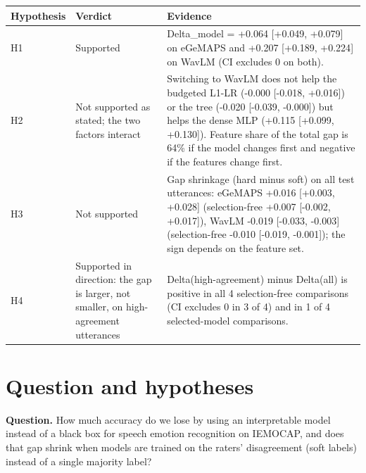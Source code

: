 \documentclass[11pt]{article}
\begin{document}
\begin{longtable}[]{@{}
  >{\raggedright\arraybackslash}p{}
  >{\raggedright\arraybackslash}p{}
  >{\raggedright\arraybackslash}p{}@{}}
\toprule\noalign{}
\begin{minipage}[b]{\linewidth}\raggedright
Hypothesis
\end{minipage} & \begin{minipage}[b]{\linewidth}\raggedright
Verdict
\end{minipage} & \begin{minipage}[b]{\linewidth}\raggedright
Evidence
\end{minipage} \\
\midrule\noalign{}
\endhead
\bottomrule\noalign{}
\endlastfoot
H1 & Supported & Delta\_model = +0.064 {[}+0.049, +0.079{]} on eGeMAPS and +0.207 {[}+0.189, +0.224{]} on WavLM (CI excludes 0 on both). \\
H2 & Not supported as stated; the two factors interact & Switching to WavLM does not help the budgeted L1-LR (-0.000 {[}-0.018, +0.016{]}) or the tree (-0.020 {[}-0.039, -0.000{]}) but helps the dense MLP (+0.115 {[}+0.099, +0.130{]}). Feature share of the total gap is 64\% if the model changes first and negative if the features change first. \\
H3 & Not supported & Gap shrinkage (hard minus soft) on all test utterances: eGeMAPS +0.016 {[}+0.003, +0.028{]} (selection-free +0.007 {[}-0.002, +0.017{]}), WavLM -0.019 {[}-0.033, -0.003{]} (selection-free -0.010 {[}-0.019, -0.001{]}); the sign depends on the feature set. \\
H4 & Supported in direction: the gap is larger, not smaller, on high-agreement utterances & Delta(high-agreement) minus Delta(all) is positive in all 4 selection-free comparisons (CI excludes 0 in 3 of 4) and in 1 of 4 selected-model comparisons. \\
\end{longtable}

\section{Question and hypotheses}\label{question-and-hypotheses}

\textbf{Question.} How much accuracy do we lose by using an interpretable model instead of a black box for speech emotion recognition on IEMOCAP, and does that gap shrink when models are trained on the raters' disagreement (soft labels) instead of a single majority label?
\end{document}
